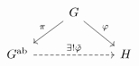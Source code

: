 \documentclass{article}
\begin{document}
    \begin{equation*}
        \begin{tikzcd}
            & G \ar[dl, "\pi"'] \ar[dr, "\phi"] \\
            G^\textrm{ab} \ar[rr, "\ex!\tilde{\phi}", dashed] & & H
        \end{tikzcd}
    \end{equation*}
\end{document}
